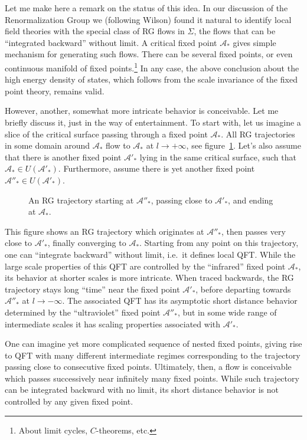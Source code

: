Let me make here a remark on the status of this idea. In our discussion of the
Renormalization Group we (following Wilson) found it natural to identify local field
theories with the special class of RG flows in $\Sigma$, the flows that can be
``integrated backward'' without limit. A critical fixed point $\mathcal A_*$ gives
simple mechanism for generating such flows. There can be several fixed points, or
even continuous manifold of fixed points.\footnote{About limit cycles,
$C$-theorems, etc.} In any case, the above conclusion about the high energy density
of states, which follows from the scale invariance of the fixed point theory,
remains valid.

However, another, somewhat more intricate behavior is conceivable. Let me briefly
discuss it, just in the way of entertainment. To start with, let us imagine a slice
of the critical surface passing through a fixed point $\mathcal A_*$. All RG
trajectories in some domain around $\mathcal A_*$ flow to $\mathcal A_*$ at
$l\to+\infty$, see figure~\ref{fig:nestedfp}. Let's also assume that there is
another fixed point $\mathcal A'_*$ lying in the same critical surface, such that
$\mathcal A_*\in U(\mathcal A'_*)$. Furthermore, assume there is yet another fixed
point $\mathcal A''_*\in U(\mathcal A'_*)$.
\begin{figure}[ht]
\centering{}
\caption{An RG trajectory starting at $\mathcal A''_*$, passing close to
$\mathcal A'_*$, and ending at $\mathcal A_*$.}
\label{fig:nestedfp}
\end{figure}

This figure shows an RG trajectory which originates at $\mathcal A''_*$, then passes
very close to $\mathcal A'_*$, finally converging to $\mathcal A_*$. Starting from
any point on this trajectory, one can ``integrate backward'' without limit, i.e.\
it defines local QFT. While the large scale properties of this QFT are controlled by
the ``infrared'' fixed point $\mathcal A_*$, its behavior at shorter scales is more
intricate. When traced backwards, the RG trajectory stays long ``time'' near the
fixed point $\mathcal A'_*$, before departing towards $\mathcal A''_*$ at
$l\to-\infty$. The associated QFT has its asymptotic short distance behavior
determined by the ``ultraviolet'' fixed point $\mathcal A''_*$, but in some wide
range of intermediate scales it has scaling properties associated with
$\mathcal A'_*$.

One can imagine yet more complicated sequence of nested fixed points, giving rise to
QFT with many different intermediate regimes corresponding to the trajectory passing
close to consecutive fixed points. Ultimately, then, a flow is conceivable which
passes successively near infinitely many fixed points. While such trajectory can be
integrated backward with no limit, its short distance behavior is not controlled by
any given fixed point.
